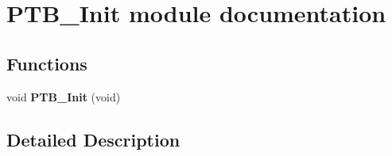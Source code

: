 \hypertarget{group___p_t_b___init__module}{}\section{P\+T\+B\+\_\+\+Init module documentation}
\label{group___p_t_b___init__module}
\subsection*{Functions}
\begin{DoxyCompactItemize}
\item 
void {\bfseries P\+T\+B\+\_\+\+Init} (void)\hypertarget{group___p_t_b___init__module_gad8e7244fd8fce3ce57df503dbaca010a}{}\label{group___p_t_b___init__module_gad8e7244fd8fce3ce57df503dbaca010a}

\end{DoxyCompactItemize}


\subsection{Detailed Description}
